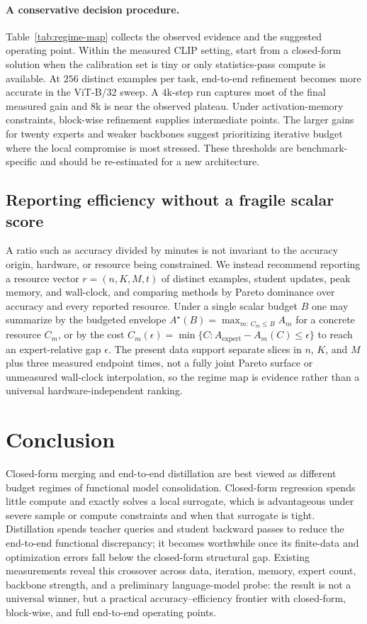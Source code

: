 \documentclass[letterpaper]{article} %
\theoremstyle{plain}
\theoremstyle{definition}
\begin{document}
\paragraph{A conservative decision procedure.}
Table~\ref{tab:regime-map} collects the observed evidence and the suggested operating point.
Within the measured CLIP setting, start from a closed-form solution when the calibration set is tiny or only statistics-pass compute is available.
At $256$ distinct examples per task, end-to-end refinement becomes more accurate in the ViT-B/32 sweep.
A $4$k-step run captures most of the final measured gain and $8$k is near the observed plateau.
Under activation-memory constraints, block-wise refinement supplies intermediate points.
The larger gains for twenty experts and weaker backbones suggest prioritizing iterative budget where the local compromise is most stressed.
These thresholds are benchmark-specific and should be re-estimated for a new architecture.

\subsection{Reporting efficiency without a fragile scalar score}
\label{sec:efficiency-metrics}
A ratio such as accuracy divided by minutes is not invariant to the accuracy origin, hardware, or resource being constrained.
We instead recommend reporting a resource vector $r=(n,K,M,t)$ of distinct examples, student updates, peak memory, and wall-clock, and comparing methods by Pareto dominance over accuracy and every reported resource.
Under a single scalar budget $B$ one may summarize by the budgeted envelope $A^\star(B)=\max_{m:\,C_m\le B}A_m$ for a concrete resource $C_m$, or by the cost $C_m(\epsilon)=\min\{C:A_{\mathrm{expert}}-A_m(C)\le\epsilon\}$ to reach an expert-relative gap $\epsilon$.
The present data support separate slices in $n$, $K$, and $M$ plus three measured endpoint times, not a fully joint Pareto surface or unmeasured wall-clock interpolation, so the regime map is evidence rather than a universal hardware-independent ranking.

\section{Conclusion}
\label{sec:conclusion}

Closed-form merging and end-to-end distillation are best viewed as different budget regimes of functional model consolidation.
Closed-form regression spends little compute and exactly solves a local surrogate, which is advantageous under severe sample or compute constraints and when that surrogate is tight.
Distillation spends teacher queries and student backward passes to reduce the end-to-end functional discrepancy; it becomes worthwhile once its finite-data and optimization errors fall below the closed-form structural gap.
Existing measurements reveal this crossover across data, iteration, memory, expert count, backbone strength, and a preliminary language-model probe: the result is not a universal winner, but a practical accuracy--efficiency frontier with closed-form, block-wise, and full end-to-end operating points.

\clearpage

\end{document}
